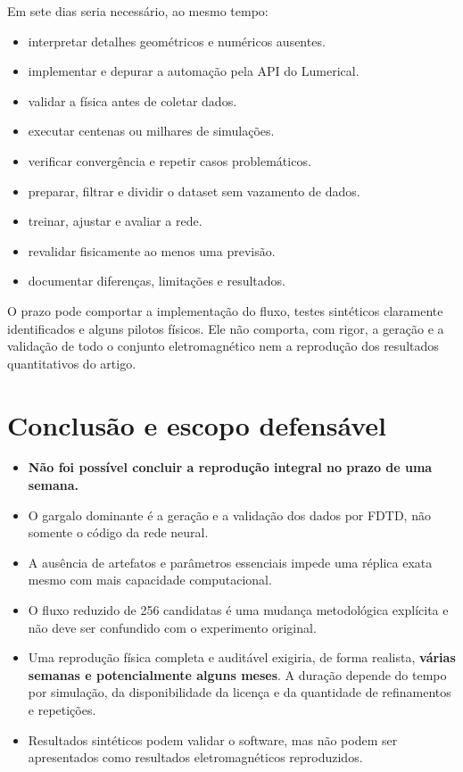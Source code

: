 \documentclass[11pt,a4paper]{article}
\begin{document}
Em sete dias seria necessário, ao mesmo tempo:

\begin{itemize}
\item interpretar detalhes geométricos e numéricos ausentes.
\item implementar e depurar a automação pela API do Lumerical.
\item validar a física antes de coletar dados.
\item executar centenas ou milhares de simulações.
\item verificar convergência e repetir casos problemáticos.
\item preparar, filtrar e dividir o dataset sem vazamento de dados.
\item treinar, ajustar e avaliar a rede.
\item revalidar fisicamente ao menos uma previsão.
\item documentar diferenças, limitações e resultados.
\end{itemize}

O prazo pode comportar a implementação do fluxo, testes sintéticos claramente identificados e alguns pilotos físicos. Ele não comporta, com rigor, a geração e a validação de todo o conjunto eletromagnético nem a reprodução dos resultados quantitativos do artigo.

\section{Conclusão e escopo defensável}

\begin{itemize}
\item \textbf{Não foi possível concluir a reprodução integral no prazo de uma semana.}
\item O gargalo dominante é a geração e a validação dos dados por FDTD, não somente o código da rede neural.
\item A ausência de artefatos e parâmetros essenciais impede uma réplica exata mesmo com mais capacidade computacional.
\item O fluxo reduzido de 256 candidatas é uma mudança metodológica explícita e não deve ser confundido com o experimento original.
\item Uma reprodução física completa e auditável exigiria, de forma realista, \textbf{várias semanas e potencialmente alguns meses}. A duração depende do tempo por simulação, da disponibilidade da licença e da quantidade de refinamentos e repetições.
\item Resultados sintéticos podem validar o software, mas não podem ser apresentados como resultados eletromagnéticos reproduzidos.
\end{itemize}
\end{document}
